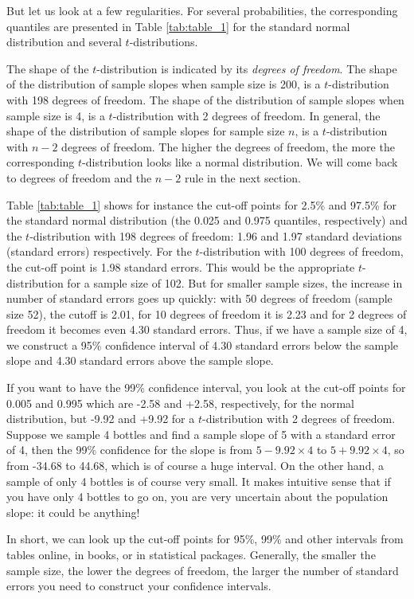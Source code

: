 \documentclass[]{book}\usepackage[]{graphicx}\usepackage[]{color}
\begin{document}
But let us look at a few regularities. For several probabilities, the corresponding quantiles are presented in Table \ref{tab:table_1} for the standard normal distribution and several $t$-distributions.

The shape of the $t$-distribution is indicated by its \textit{degrees of freedom}. The shape of the distribution of sample slopes when sample size is 200, is a $t$-distribution with 198 degrees of freedom. The shape of the distribution of sample slopes when sample size is 4, is a $t$-distribution with 2 degrees of freedom. In general, the shape of the distribution of sample slopes for sample size $n$, is a $t$-distribution with $n-2$ degrees of freedom. The higher the degrees of freedom, the more the corresponding $t$-distribution looks like a normal distribution. We will come back to degrees of freedom and the $n-2$ rule in the next section.

Table \ref{tab:table_1} shows for instance the cut-off points for 2.5\% and 97.5\% for the standard normal distribution (the 0.025 and 0.975 quantiles, respectively) and the $t$-distribution with 198 degrees of freedom: 1.96 and 1.97 standard deviations (standard errors) respectively. For the $t$-distribution with 100 degrees of freedom, the cut-off point is 1.98 standard errors. This would be the appropriate $t$-distribution for a sample size of 102. But for smaller sample sizes, the increase in number of standard errors goes up quickly: with 50 degrees of freedom (sample size 52), the cutoff is 2.01, for 10 degrees of freedom it is 2.23 and for 2 degrees of freedom it becomes even 4.30 standard errors. Thus, if we have a sample size of 4, we construct a 95\% confidence interval of 4.30 standard errors below the sample slope and 4.30 standard errors above the sample slope.

If you want to have the 99\% confidence interval, you look at the cut-off points for 0.005 and 0.995 which are -2.58 and +2.58, respectively, for the normal distribution, but -9.92 and +9.92 for a $t$-distribution with 2 degrees of freedom. Suppose we sample 4 bottles and find a sample slope of 5 with a standard error of 4, then the 99\% confidence for the slope is from $5-9.92\times 4$ to $5+9.92\times 4$, so from -34.68 to 44.68, which is of course a huge interval. On the other hand, a sample of only 4 bottles is of course very small. It makes intuitive sense that if you have only 4 bottles to go on, you are very uncertain about the population slope: it could be anything!

In short, we can look up the cut-off points for 95\%, 99\% and other intervals from tables online, in books, or in statistical packages. Generally, the smaller the sample size, the lower the degrees of freedom, the larger the number of standard errors you need to construct your confidence intervals.
\end{document}
